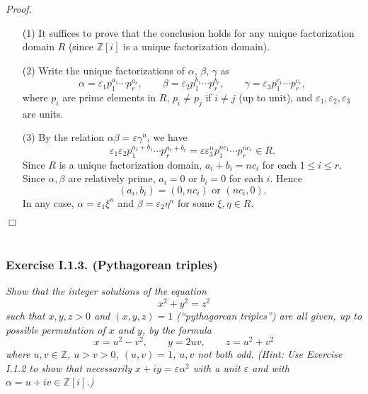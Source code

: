 \documentclass{article}
\begin{document}
\emph{Proof.}
\begin{enumerate}
\item[(1)]
  It suffices to prove that the conclusion holds for any unique factorization domain $R$
  (since $\mathbb{Z}[i]$ is a unique factorization domain).

\item[(2)]
  Write the unique factorizations of $\alpha$, $\beta$, $\gamma$ as
  \[
    \alpha = \varepsilon_1 p_1^{a_1} \cdots p_r^{a_r},
    \qquad
    \beta = \varepsilon_2 p_1^{b_1} \cdots p_r^{b_r},
    \qquad
    \gamma = \varepsilon_3 p_1^{c_1} \cdots p_r^{c_r},
  \]
  where $p_i$ are prime elements in $R$, $p_i \neq p_j$ if $i \neq j$ (up to unit),
  and $\varepsilon_1, \varepsilon_2, \varepsilon_3$ are units.

\item[(3)]
  By the relation $\alpha\beta = \varepsilon\gamma^n$, we have
  \[
    \varepsilon_1 \varepsilon_2 p_1^{a_1+b_1} \cdots p_r^{a_r+b_r}
    = \varepsilon \varepsilon_3^n p_1^{n c_1} \cdots p_r^{n c_r} \in R.
  \]
  Since $R$ is a unique factorization domain,
  $a_i + b_i = n c_i$ for each $1 \leq i \leq r$.
  Since $\alpha,\beta$ are relatively prime, $a_i = 0$ or $b_i = 0$ for each $i$.
  Hence
  \[
    (a_i,b_i) = (0,nc_i) \text{ or } (nc_i,0).
  \]
  In any case, $\alpha = \varepsilon_1 \xi^n$ and $\beta = \varepsilon_2 \eta^n$
  for some $\xi, \eta \in R$.
\end{enumerate}
$\Box$ \\\\






\subsubsection*{Exercise I.1.3. (Pythagorean triples)}
\emph{Show that the integer solutions of the equation
\[
  x^2+y^2 = z^2
\]
such that $x, y, z > 0$ and $(x,y,z) = 1$ (``pythagorean triples'') are all given,
up to possible permutation of $x$ and $y$, by the formula
\[
  x = u^2-v^2,
  \qquad
  y = 2uv,
  \qquad
  z = u^2+v^2
\]
where $u, v \in \mathbb{Z}$, $u > v > 0$, $(u,v) = 1$, $u, v$ not both odd.
(Hint: Use Exercise I.1.2 to show that necessarily $x+iy = \varepsilon\alpha^2$
with a unit $\varepsilon$ and with $\alpha = u+iv \in \mathbb{Z}[i]$.)} \\
\end{document}
